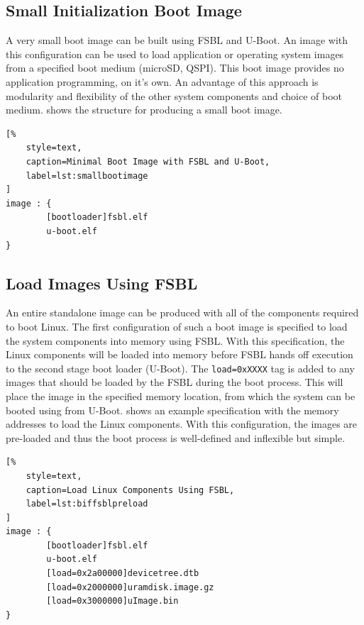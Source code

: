 \subsection{Small Initialization Boot Image}

A very small boot image can be built using FSBL and U-Boot. An image with this configuration can be used to load application or operating system images from a specified boot medium (\ie microSD, QSPI). This boot image provides no application programming, on it's own. An advantage of this approach is modularity and flexibility of the other system components and choice of boot medium.  shows the  structure for producing a small boot image.


\begin{lstlisting}[%
	style=text,
	caption=Minimal Boot Image with FSBL and U-Boot,
	label=lst:smallbootimage
]
image : {
        [bootloader]fsbl.elf
        u-boot.elf
}
\end{lstlisting}


\subsection{Load Images Using FSBL}


An entire standalone image can be produced with all of the components required to boot Linux. The first configuration of such a boot image is specified to load the system components into memory using FSBL. With this specification, the Linux components will be loaded into memory before FSBL hands off execution to the second stage boot loader (U-Boot). The \texttt{load=0xXXXX} tag is added to any images that should be loaded by the FSBL during the boot process. This will place the image in the specified memory location, from which the system can be booted using  from U-Boot.  shows an example  specification with the memory addresses to load the Linux components. With this configuration, the images are pre-loaded and thus the boot process is well-defined and inflexible but simple.


\begin{lstlisting}[%
	style=text,
	caption=Load Linux Components Using FSBL,
	label=lst:biffsblpreload
]
image : {
        [bootloader]fsbl.elf
        u-boot.elf
        [load=0x2a00000]devicetree.dtb
        [load=0x2000000]uramdisk.image.gz
        [load=0x3000000]uImage.bin
}
\end{lstlisting}

